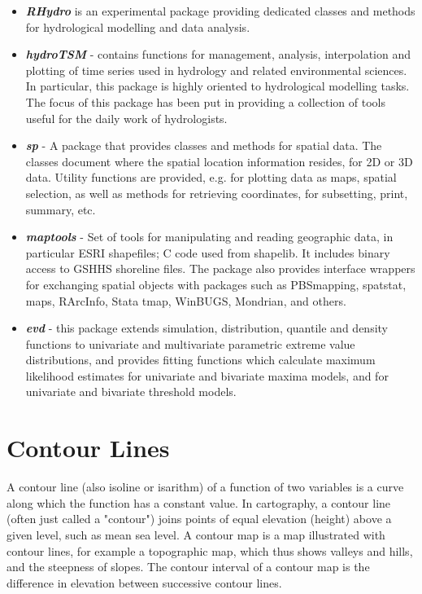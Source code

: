 \documentclass[12pt, a4paper]{article}
\theoremstyle{plain}
\theoremstyle{definition}
\theoremstyle{remark}
\begin{document}


\begin{itemize}

\item \textbf{\emph{RHydro}}
 is an experimental package providing dedicated classes and methods for hydrological modelling and data analysis.

\item \textbf{\emph{hydroTSM}} - contains functions for
management, analysis, interpolation and plotting of
 time series used in hydrology and related environmental sciences.
 In particular, this package is highly oriented to hydrological modelling tasks.
 The focus of this package has been put in providing a collection of tools useful for the daily work of hydrologists.


\item \textbf{\emph{sp}} - A package that provides classes and
methods for spatial data. The classes document where the spatial
location information resides, for 2D or 3D data. Utility functions
are provided, e.g. for plotting data as maps, spatial selection,
as well as methods for retrieving coordinates, for subsetting,
print, summary, etc.

\item \textbf{\emph{maptools}} - Set of tools for manipulating and
reading geographic data, in particular ESRI shapefiles; C code
used from shapelib. It includes binary access to GSHHS shoreline
files. The package also provides interface wrappers for exchanging
spatial objects with packages such as PBSmapping, spatstat, maps,
RArcInfo, Stata tmap, WinBUGS, Mondrian, and others.

\item \textbf{\emph{evd}} - this package extends simulation,
distribution, quantile and density functions to univariate and
multivariate parametric extreme value distributions, and provides
fitting functions which calculate maximum likelihood estimates for
univariate and bivariate maxima models, and for univariate and
bivariate threshold models.



\end{itemize}



\section{Contour Lines}
A contour line (also isoline or isarithm) of a function of two variables is a curve along which the function has a constant value.
In cartography, a contour line (often just called a "contour") joins points of equal elevation (height) above a given level, such as mean sea level.
 A contour map is a map illustrated with contour lines, for example a topographic map, which thus shows valleys and hills, and the steepness of slopes.
The contour interval of a contour map is the difference in elevation between successive contour lines.
\end{document}
